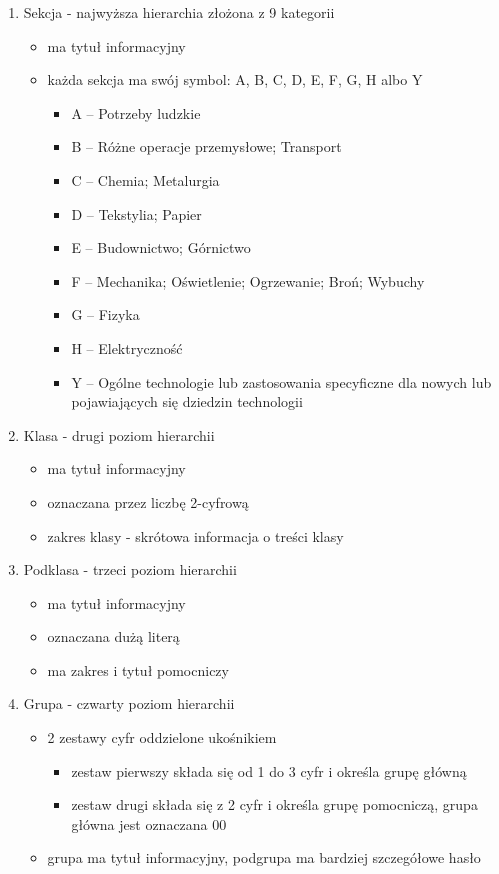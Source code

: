 \begin{enumerate}
    \item Sekcja - najwyższa hierarchia złożona z 9 kategorii
    \begin{itemize}
        \item ma tytuł informacyjny
        \item każda sekcja ma swój symbol: A, B, C, D, E, F, G, H albo Y
        \begin{itemize}
            \item A – Potrzeby ludzkie
            \item B – Różne operacje przemysłowe; Transport
            \item C – Chemia; Metalurgia
            \item D – Tekstylia; Papier
            \item E – Budownictwo; Górnictwo
            \item F – Mechanika; Oświetlenie; Ogrzewanie; Broń; Wybuchy
            \item G – Fizyka
            \item H – Elektryczność
            \item Y – Ogólne technologie lub zastosowania specyficzne dla nowych lub pojawiających się dziedzin technologii
        \end{itemize}
    \end{itemize}
    \item Klasa - drugi poziom hierarchii
    \begin{itemize}
        \item ma tytuł informacyjny
        \item oznaczana przez liczbę 2-cyfrową
        \item zakres klasy - skrótowa informacja o treści klasy
    \end{itemize}
    \item Podklasa - trzeci poziom hierarchii
    \begin{itemize}
        \item ma tytuł informacyjny
        \item oznaczana dużą literą
        \item ma zakres i tytuł pomocniczy
    \end{itemize}
    \item Grupa - czwarty poziom hierarchii
    \begin{itemize}
        \item 2 zestawy cyfr oddzielone ukośnikiem
        \begin{itemize}
            \item zestaw pierwszy składa się od 1 do 3 cyfr i określa grupę główną
            \item zestaw drugi składa się z 2 cyfr i określa grupę pomocniczą, grupa główna jest oznaczana 00
        \end{itemize}
        \item grupa ma tytuł informacyjny, podgrupa ma bardziej szczegółowe hasło
    \end{itemize}
\end{enumerate}



